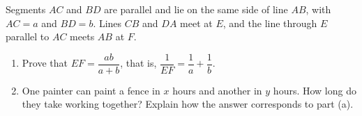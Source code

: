Segments $AC$ and $BD$ are parallel and lie on the same side of line $AB$, with $AC=a$ and $BD=b$. Lines $CB$ and $DA$ meet at $E$, and the line through $E$ parallel to $AC$ meets $AB$ at $F$.
\begin{enumerate}
\item[(a)] Prove that $EF=\dfrac{ab}{a+b}$, that is, $\dfrac{1}{EF}=\dfrac{1}{a}+\dfrac{1}{b}$.
\item[(b)] One painter can paint a fence in $x$ hours and another in $y$ hours. How long do they take working together? Explain how the answer corresponds to part (a).
\end{enumerate}
